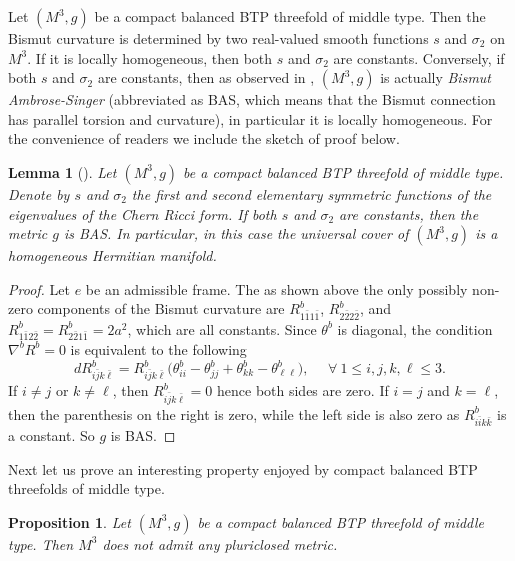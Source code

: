 \documentclass{amsart}
\numberwithin{equation}{section}
\newtheorem{proposition}[theorem]{Proposition}
\newtheorem{lemma}  [theorem]     {Lemma}
\theoremstyle{definition}
\renewcommand{\1}{\mathds{1}}
\renewcommand{\>}{\rightarrow}
\begin{document}
Let $(M^3,g)$ be a compact balanced BTP threefold of middle type. Then the Bismut curvature is determined by two real-valued smooth functions $s$ and $\sigma_2$ on $M^3$. If it is locally homogeneous, then both $s$ and $\sigma_2$ are constants. Conversely, if both $s$ and $\sigma_2$ are constants, then as observed in \cite[Proposition 1.7]{PodestaZ}, $(M^3,g)$ is actually {\em Bismut Ambrose-Singer} (abbreviated as BAS, which means that the Bismut connection has parallel torsion and curvature), in particular it is locally homogeneous. For the convenience of readers we include the sketch of proof below.

\begin{lemma} [\cite{PodestaZ}] \label{lemmaPodestaZ}
Let $(M^3,g)$ be a compact balanced BTP threefold of middle type. Denote by $s$ and $\sigma_2$ the first and second elementary symmetric functions of the eigenvalues of the Chern Ricci form. If both  $s$ and $\sigma_2$ are constants, then the metric $g$ is BAS. In particular, in this case the universal cover of $(M^3,g)$ is a homogeneous Hermitian manifold.
\end{lemma}

\begin{proof}
Let $e$ be an admissible frame. The as shown above the only possibly non-zero components of the Bismut curvature are $R^b_{1\bar{1}1\bar{1}}$, $R^b_{2\bar{2}2\bar{2}}$, and $R^b_{1\bar{1}2\bar{2}} =R^b_{2\bar{2}1\bar{1}} =2a^2$, which are all constants. Since $\theta^b$ is diagonal, the condition  $\nabla^bR^b=0$ is equivalent to the following
$$ dR^b_{i\bar{j}k\bar{\ell}} = R^b_{i\bar{j}k\bar{\ell}} \big( \theta^b_{ii} - \theta^b_{jj} + \theta^b_{kk} - \theta^b_{\ell  \ell } \big) , \ \ \ \ \ \ \forall \ 1\leq i,j,k,\ell\leq 3. $$
If $i\neq j$ or $k\neq \ell$, then $R^b_{i\bar{j}k\bar{\ell}} =  0$ hence both sides are zero. If $i=j$ and $k=\ell$, then the parenthesis on the right is zero, while the left side is also zero as $R^b_{i\bar{i}k\bar{k}}$  is a constant. So $g$ is BAS.
\end{proof}






Next let us prove an interesting property enjoyed by compact balanced BTP threefolds of middle type.

\begin{proposition} \label{prop6.7}
Let $(M^3,g)$ be a compact balanced BTP threefold of middle type. Then $M^3$ does not admit any pluriclosed metric.
\end{proposition}
\end{document}
